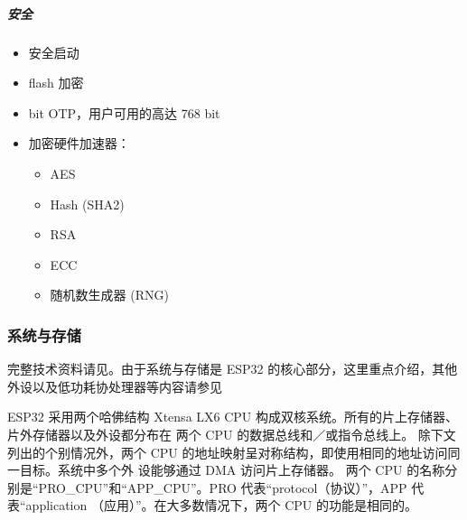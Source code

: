 \documentclass[a4paper,12pt,english]{sphinxmanual}
\begin{document}
\subparagraph{安全}
\label{\detokenize{dev-board/esp32:id6}}\begin{itemize}
\item {} 
\sphinxAtStartPar
安全启动

\item {} 
\sphinxAtStartPar
flash 加密

\item {} 
\sphinxhyphen{}bit OTP，用户可用的高达 768 bit

\item {} 
\sphinxAtStartPar
加密硬件加速器：
\begin{itemize}
\item {} 
\sphinxAtStartPar
AES

\item {} 
\sphinxAtStartPar
Hash (SHA\sphinxhyphen{}2)

\item {} 
\sphinxAtStartPar
RSA

\item {} 
\sphinxAtStartPar
ECC

\item {} 
\sphinxAtStartPar
随机数生成器 (RNG)

\end{itemize}

\end{itemize}


\subsubsection{系统与存储}
\label{\detokenize{dev-board/esp32:id7}}
\sphinxAtStartPar
完整技术资料请见{\hyperref[\detokenize{dev-board/esp32:../reference.md}]{}}。由于系统与存储是 ESP32 的核心部分，这里重点介绍，其他外设以及低功耗协处理器等内容请参见

\sphinxAtStartPar
ESP32 采用两个哈佛结构 Xtensa LX6 CPU 构成双核系统。所有的片上存储器、片外存储器以及外设都分布在 两个 CPU 的数据总线和／或指令总线上。 除下文列出的个别情况外，两个 CPU 的地址映射呈对称结构，即使用相同的地址访问同一目标。系统中多个外 设能够通过 DMA 访问片上存储器。 两个 CPU 的名称分别是“PRO\_CPU”和“APP\_CPU”。PRO 代表“protocol（协议）”，APP 代表“application （应用）”。在大多数情况下，两个 CPU 的功能是相同的。
\end{document}
